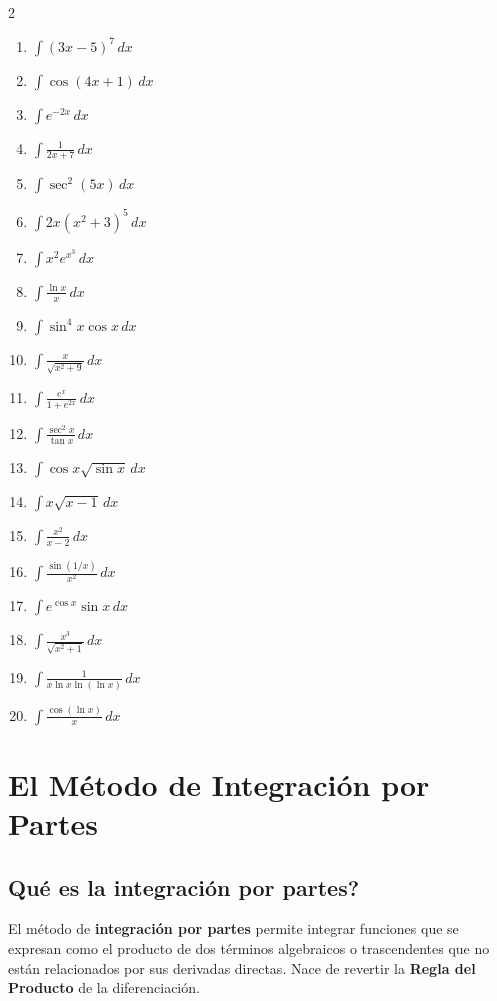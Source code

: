 \documentclass[12pt, letterpaper]{article}
\newcommand{\dx}{\,dx}
\begin{document}
\begin{multicols}{2}
\begin{enumerate}[leftmargin=*]
  \item \facil{} $\int (3x - 5)^7 \dx$
  \item \facil{} $\int \cos(4x + 1) \dx$
  \item \facil{} $\int e^{-2x} \dx$
  \item \facil{} $\int \frac{1}{2x + 7} \dx$
  \item \facil{} $\int \sec^2(5x) \dx$
  \item \medio{} $\int 2x(x^2 + 3)^5 \dx$
  \item \medio{} $\int x^2 e^{x^3} \dx$
  \item \medio{} $\int \frac{\ln x}{x} \dx$
  \item \medio{} $\int \sin^4 x \cos x \dx$
  \item \medio{} $\int \frac{x}{\sqrt{x^2 + 9}} \dx$
  \item \medio{} $\int \frac{e^x}{1 + e^{2x}} \dx$
  \item \medio{} $\int \frac{\sec^2 x}{\tan x} \dx$
  \item \medio{} $\int \cos x \sqrt{\sin x} \dx$
  \item \dificil{} $\int x \sqrt{x - 1} \dx$
  \item \dificil{} $\int \frac{x^2}{x - 2} \dx$
  \item \dificil{} $\int \frac{\sin(1/x)}{x^2} \dx$
  \item \dificil{} $\int e^{\cos x} \sin x \dx$
  \item \dificil{} $\int \frac{x^3}{\sqrt{x^2 + 1}} \dx$
  \item \dificil{} $\int \frac{1}{x \ln x \ln(\ln x)} \dx$
  \item \dificil{} $\int \frac{\cos(\ln x)}{x} \dx$
\end{enumerate}
\end{multicols}

\vspace{10pt}

\section{El Método de Integración por Partes}

\subsection{\textquestiondown Qué es la integración por partes?}
El método de \textbf{integración por partes} permite integrar funciones que se expresan como el producto de dos términos algebraicos o trascendentes que no están relacionados por sus derivadas directas. Nace de revertir la \textbf{Regla del Producto} de la diferenciación.
\end{document}
